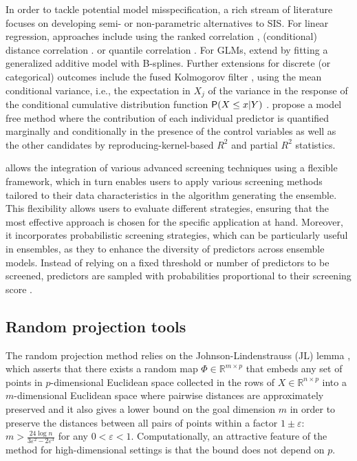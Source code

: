 \documentclass[
  article]{jss}
\begin{document}
In order to tackle potential model misspecification, a rich stream of
literature focuses on developing semi- or non-parametric alternatives to
SIS. For linear regression, approaches include using the ranked
correlation \citep{zhu2011model}, (conditional) distance correlation
\citep{li2012feature, wang2015conditional}. or quantile correlation
\citep{ma2016robust}. For GLMs, \citet{fan2011nonparametric} extend
\citet{Fan2010sisglms} by fitting a generalized additive model with
B-splines. Further extensions for discrete (or categorical) outcomes
include the fused Kolmogorov filter \citep{mai2013kolmogorov}, using the
mean conditional variance, i.e., the expectation in \(X_j\) of the
variance in the response of the conditional cumulative distribution
function \(\mathsf{P}(X\leq x|Y)\) \citep{cui2015model}.
\citet{ke2023sufficient} propose a model free method where the
contribution of each individual predictor is quantified marginally and
conditionally in the presence of the control variables as well as the
other candidates by reproducing-kernel-based \(R^2\) and partial \(R^2\)
statistics.

 allows the integration of various advanced screening
techniques using a flexible framework, which in turn enables users to
apply various screening methods tailored to their data characteristics
in the algorithm generating the ensemble. This flexibility allows users
to evaluate different strategies, ensuring that the most effective
approach is chosen for the specific application at hand. Moreover, it
incorporates probabilistic screening strategies, which can be
particularly useful in ensembles, as they to enhance the diversity of
predictors across ensemble models. Instead of relying on a fixed
threshold or number of predictors to be screened, predictors are sampled
with probabilities proportional to their screening score
\citep[see][]{Dunson2020TargRandProj, parzer2024glms}.

\subsection{Random projection tools}\label{random-projection-tools}

The random projection method relies on the Johnson-Lindenstrauss (JL)
lemma \citep{JohnsonLindenstrauss1984}, which asserts that there exists
a random map \(\Phi\in \mathbb{R}^{m \times p}\) that embeds any set of
points in \(p\)-dimensional Euclidean space collected in the rows of
\(X\in \mathbb{R}^{n\times p}\) into a \(m\)-dimensional Euclidean space
where pairwise distances are approximately preserved and it also gives a
lower bound on the goal dimension \(m\) in order to preserve the
distances between all pairs of points within a factor
\(1\pm \varepsilon\):
\(m>\frac{24\log n}{3\varepsilon^2-2\varepsilon^3}\) for any
\(0 <\varepsilon< 1\). Computationally, an attractive feature of the
method for high-dimensional settings is that the bound does not depend
on \(p\).
\end{document}
